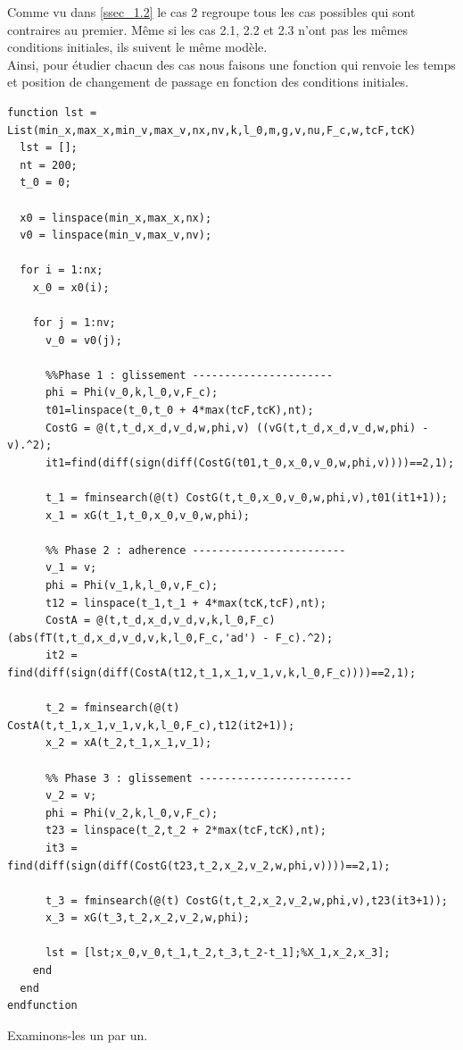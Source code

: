 \documentclass{article}
\begin{document}
Comme vu dans \ref{ssec_1.2} le cas 2 regroupe tous les cas possibles qui sont contraires au premier. Même si les cas 2.1, 2.2 et 2.3 n'ont pas les mêmes conditions initiales, ils suivent le même modèle.\\
Ainsi, pour étudier chacun des cas nous faisons une fonction qui renvoie les temps et position de changement de passage en fonction des conditions initiales.

\begin{lstlisting}
function lst = List(min_x,max_x,min_v,max_v,nx,nv,k,l_0,m,g,v,nu,F_c,w,tcF,tcK)
  lst = [];
  nt = 200;
  t_0 = 0;
  
  x0 = linspace(min_x,max_x,nx);
  v0 = linspace(min_v,max_v,nv);

  for i = 1:nx;
    x_0 = x0(i);
    
    for j = 1:nv;
      v_0 = v0(j);

      %%Phase 1 : glissement ----------------------
      phi = Phi(v_0,k,l_0,v,F_c);
      t01=linspace(t_0,t_0 + 4*max(tcF,tcK),nt);
      CostG = @(t,t_d,x_d,v_d,w,phi,v) ((vG(t,t_d,x_d,v_d,w,phi) - v).^2);
      it1=find(diff(sign(diff(CostG(t01,t_0,x_0,v_0,w,phi,v))))==2,1);
      
      t_1 = fminsearch(@(t) CostG(t,t_0,x_0,v_0,w,phi,v),t01(it1+1));
      x_1 = xG(t_1,t_0,x_0,v_0,w,phi);
      
      %% Phase 2 : adherence ------------------------
      v_1 = v;
      phi = Phi(v_1,k,l_0,v,F_c);
      t12 = linspace(t_1,t_1 + 4*max(tcK,tcF),nt);      
      CostA = @(t,t_d,x_d,v_d,v,k,l_0,F_c) (abs(fT(t,t_d,x_d,v_d,v,k,l_0,F_c,'ad') - F_c).^2);
      it2 = find(diff(sign(diff(CostA(t12,t_1,x_1,v_1,v,k,l_0,F_c))))==2,1);
      
      t_2 = fminsearch(@(t) CostA(t,t_1,x_1,v_1,v,k,l_0,F_c),t12(it2+1));
      x_2 = xA(t_2,t_1,x_1,v_1);
      
      %% Phase 3 : glissement ------------------------
      v_2 = v;
      phi = Phi(v_2,k,l_0,v,F_c);
      t23 = linspace(t_2,t_2 + 2*max(tcF,tcK),nt);
      it3 = find(diff(sign(diff(CostG(t23,t_2,x_2,v_2,w,phi,v))))==2,1);
      
      t_3 = fminsearch(@(t) CostG(t,t_2,x_2,v_2,w,phi,v),t23(it3+1));
      x_3 = xG(t_3,t_2,x_2,v_2,w,phi);

      lst = [lst;x_0,v_0,t_1,t_2,t_3,t_2-t_1];%X_1,x_2,x_3];
    end
  end
endfunction
\end{lstlisting}



Examinons-les un par un.
\end{document}
